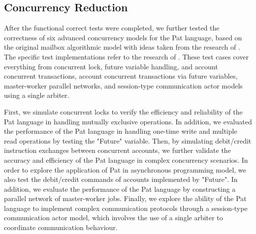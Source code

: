 \documentclass{l4proj}
\begin{document}
\subsection{Concurrency Reduction}
After the functional correct tests were completed, we further tested the correctness of six advanced concurrency models for the Pat language, based on the original mailbox algorithmic model with ideas taken from the research of \cite{deaposliguoro_2018_mailbox}. The specific test implementations refer to the research of \cite{fowler_2023_special}. These test cases cover everything from concurrent lock, future variable handling, and account concurrent transactions, account concurrent transactions via future variables, master-worker parallel networks, and session-type communication actor models using a single arbiter.

First, we simulate concurrent locks to verify the efficiency and reliability of the Pat language in handling mutually exclusive operations. In addition, we evaluated the performance of the Pat language in handling one-time write and multiple read operations by testing the "Future" variable. Then, by simulating debit/credit instruction exchanges between concurrent accounts, we further validate the accuracy and efficiency of the Pat language in complex concurrency scenarios. In order to explore the application of Pat in asynchronous programming model, we also test the debit/credit commands of accounts implemented by "Future". In addition, we evaluate the performance of the Pat language by constructing a parallel network of master-worker jobs. Finally, we explore the ability of the Pat language to implement complex communication protocols through a session-type communication actor model, which involves the use of a single arbiter to coordinate communication behaviour.
\end{document}
